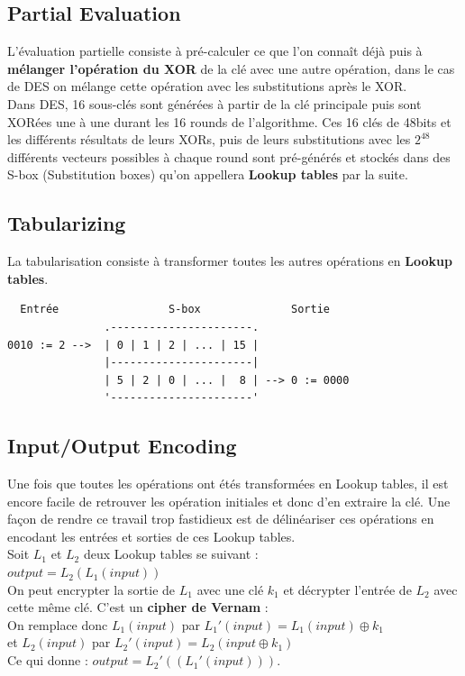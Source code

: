 \documentclass[a4paper,12pt]{article}
\begin{document}
\subsection{Partial Evaluation}

L'évaluation partielle consiste à pré-calculer ce que l'on connaît déjà puis à \textbf{mélanger l'opération du XOR} de la clé avec une autre opération, dans le cas de DES on mélange cette opération avec les substitutions après le XOR.\\
Dans DES, 16 sous-clés sont générées à partir de la clé principale puis sont XORées une à une durant les 16 rounds de l'algorithme. Ces 16 clés de 48bits et les différents résultats de leurs XORs, puis de leurs substitutions avec les $2^{48}$ différents vecteurs possibles à chaque round sont pré-générés et stockés dans des S-box (Substitution boxes) qu'on appellera \textbf{Lookup tables} par la suite.


\subsection{Tabularizing}

La tabularisation consiste à transformer toutes les autres opérations en \textbf{Lookup tables}.

\begin{verbatim}
  Entrée                 S-box              Sortie
               .----------------------.
0010 := 2 -->  | 0 | 1 | 2 | ... | 15 |
               |----------------------|
               | 5 | 2 | 0 | ... |  8 | --> 0 := 0000
               '----------------------'
\end{verbatim}


\subsection{Input/Output Encoding}

Une fois que toutes les opérations ont étés transformées en Lookup tables, il est encore facile de retrouver les opération initiales et donc d'en extraire la clé. Une façon de rendre ce travail trop fastidieux est de délinéariser ces opérations en encodant les entrées et sorties de ces Lookup tables.\\

Soit $L_1$ et $L_2$ deux Lookup tables se suivant :\\
$output = L_2(L_1(input))$\\
On peut encrypter la sortie de $L_1$ avec une clé $k_1$ et décrypter l'entrée de $L_2$ avec cette même clé. C'est un \textbf{cipher de Vernam} :\\
On remplace donc $L_1(input)$ par $L_1'(input) = L_1(input) \oplus k_1$\\
et $L_2(input)$ par $L_2'(input) = L_2(input \oplus k_1)$\\
Ce qui donne : $output = L_2'((L_1'(input)))$.\\
\end{document}
